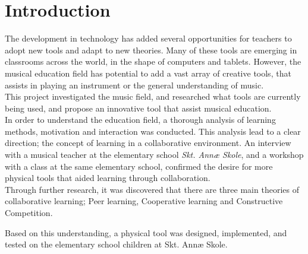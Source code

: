 \chapter{Introduction}
	The development in technology has added several opportunities for teachers to adopt new tools and adapt to new theories\cite{audiation}. Many of these tools are emerging in classrooms across the world, in the shape of computers and tablets\cite{audiation}. However, the musical education field has potential to add a vast array of creative tools, that assists in playing an instrument or the general understanding of music\cite{audiation}.\\
	
	This project investigated the music field, and researched what tools are currently being used, and propose an innovative tool that assist musical education.\\
	
	In order to understand the education field, a thorough analysis of learning methods, motivation and interaction was conducted. This analysis lead to a clear direction; the concept of learning in a collaborative environment. 
	An interview with a musical teacher at the elementary school \textit{Skt. Annæ Skole}, and a workshop with a class at the same elementary school, confirmed the desire for more physical tools that aided learning through collaboration. \\
	
	Through further research, it was discovered that there are three main theories of collaborative learning; Peer learning\cite{peerLearning}, Cooperative learning\cite{collaborationCooperation} and Constructive Competition\cite{collaborationCompetition}.
	
	Based on this understanding, a physical tool was designed, implemented, and tested on the elementary school children at Skt. Annæ Skole.